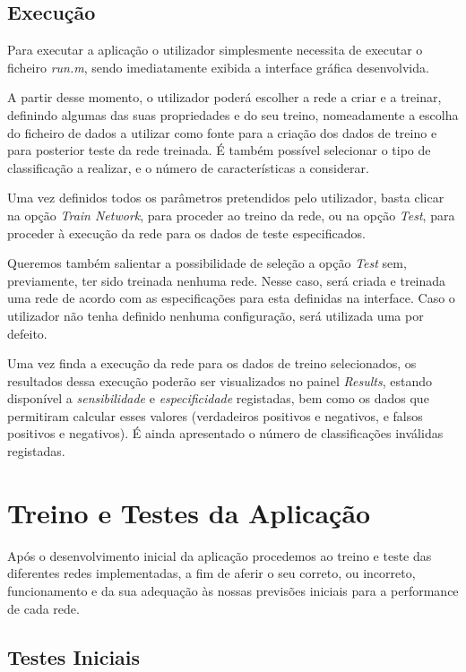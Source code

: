 \documentclass{article}
\begin{document}
\subsection{Execução}

Para executar a aplicação o utilizador simplesmente necessita de executar o ficheiro \emph{run.m}, sendo imediatamente exibida a interface gráfica desenvolvida.

A partir desse momento, o utilizador poderá escolher a rede a criar e a treinar, definindo algumas das suas propriedades e do seu treino, nomeadamente a escolha do ficheiro de dados a utilizar como fonte para a criação dos dados de treino e para posterior teste da rede treinada. É também possível selecionar o tipo de classificação a realizar, e o número de características a considerar.

Uma vez definidos todos os parâmetros pretendidos pelo utilizador, basta clicar na opção \emph{Train Network}, para proceder ao treino da rede, ou na opção \emph{Test}, para proceder à execução da rede para os dados de teste especificados.

Queremos também salientar a possibilidade de seleção a opção \emph{Test} sem, previamente, ter sido treinada nenhuma rede. Nesse caso, será criada e treinada uma rede de acordo com as especificações para esta definidas na interface. Caso o utilizador não tenha definido nenhuma configuração, será utilizada uma por defeito.

Uma vez finda a execução da rede para os dados de treino selecionados, os resultados dessa execução poderão ser visualizados no painel \emph{Results}, estando disponível a \emph{sensibilidade} e \emph{especificidade} registadas, bem como os dados que permitiram calcular esses valores (verdadeiros positivos e negativos, e falsos positivos e negativos). É ainda apresentado o número de classificações inválidas registadas. 

\pagebreak

\section{Treino e Testes da Aplicação}
\label{sec:train_tests}

Após o desenvolvimento inicial da aplicação procedemos ao treino e teste das diferentes redes implementadas, a fim de aferir o seu correto, ou incorreto, funcionamento e da sua adequação às nossas previsões iniciais para a performance de cada rede.

\subsection{Testes Iniciais}
\end{document}
